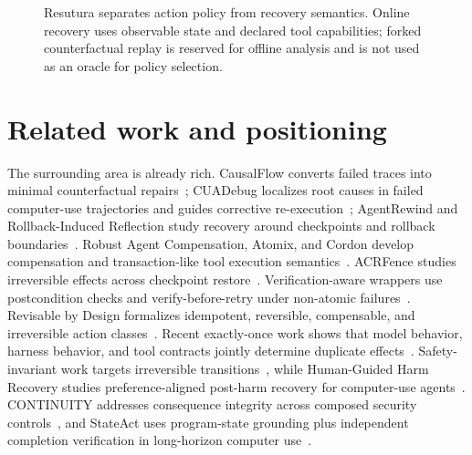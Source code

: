 \documentclass{article}
\begin{document}
\begin{figure}[t]
\centering
{}
\caption{Resutura separates action policy from recovery semantics. Online recovery uses observable state and declared tool capabilities; forked counterfactual replay is reserved for offline analysis and is not used as an oracle for policy selection.}
\label{fig:overview}
\end{figure}

\section{Related work and positioning}
The surrounding area is already rich. CausalFlow converts failed traces into minimal counterfactual repairs~\cite{causalflow}; CUADebug localizes root causes in failed computer-use trajectories and guides corrective re-execution~\cite{cuadebug}; AgentRewind and Rollback-Induced Reflection study recovery around checkpoints and rollback boundaries~\cite{agentrewind,rir}. Robust Agent Compensation, Atomix, and Cordon develop compensation and transaction-like tool execution semantics~\cite{rac,atomix,cordon}. ACRFence studies irreversible effects across checkpoint restore~\cite{acrfence}. Verification-aware wrappers use postcondition checks and verify-before-retry under non-atomic failures~\cite{verified}. Revisable by Design formalizes idempotent, reversible, compensable, and irreversible action classes~\cite{revisable}. Recent exactly-once work shows that model behavior, harness behavior, and tool contracts jointly determine duplicate effects~\cite{limbo}. Safety-invariant work targets irreversible transitions~\cite{safetyinvariants}, while Human-Guided Harm Recovery studies preference-aligned post-harm recovery for computer-use agents~\cite{harmrecovery}. CONTINUITY addresses consequence integrity across composed security controls~\cite{continuity}, and StateAct uses program-state grounding plus independent completion verification in long-horizon computer use~\cite{stateact}.
\end{document}

